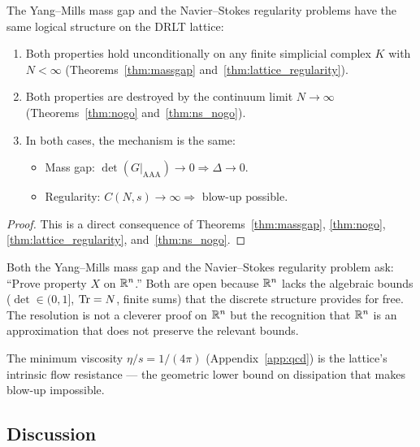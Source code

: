 \begin{theorem}
\label{thm:structural_equivalence}
The Yang--Mills mass gap and the Navier--Stokes regularity problems
have the same logical structure on the DRLT lattice:
\begin{enumerate}
\item Both properties hold unconditionally on any finite simplicial
  complex $K$ with $N < \infty$
  (Theorems~\ref{thm:massgap} and~\ref{thm:lattice_regularity}).
\item Both properties are destroyed by the continuum limit
  $N \to \infty$
  (Theorems~\ref{thm:nogo} and~\ref{thm:ns_nogo}).
\item In both cases, the mechanism is the same:
  \begin{itemize}
  \item Mass gap: $\det(G|_{\mathrm{AAA}}) \to 0 \Rightarrow
    \Delta \to 0$.
  \item Regularity: $C(N,s) \to \infty \Rightarrow$ blow-up possible.
  \end{itemize}
\end{enumerate}
\end{theorem}

\begin{proof}
This is a direct consequence of Theorems~\ref{thm:massgap},
\ref{thm:nogo}, \ref{thm:lattice_regularity},
and~\ref{thm:ns_nogo}.
\end{proof}

\begin{remark}
Both the Yang--Mills mass gap and the Navier--Stokes regularity
problem ask: ``Prove property $X$ on $\mathbb{R}^n$.''  Both are open
because $\mathbb{R}^n$ lacks the algebraic bounds ($\det \in (0,1]$,
$\operatorname{Tr} = N$, finite sums) that the discrete structure provides for free.
The resolution is not a cleverer proof on $\mathbb{R}^n$ but the recognition
that $\mathbb{R}^n$ is an approximation that does not preserve the relevant
bounds.

The minimum viscosity $\eta/s = 1/(4\pi)$
(Appendix~\ref{app:qcd}) is the lattice's intrinsic flow resistance
--- the geometric lower bound on dissipation that makes blow-up
impossible.
\end{remark}

\subsection{Discussion}
\label{sec:discussion}

